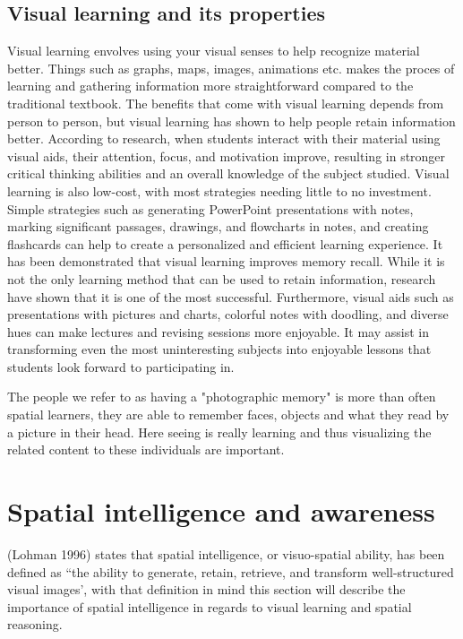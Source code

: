 \subsection{Visual learning and its properties}\label{ch:visualLearningAndItsProperties}
Visual learning envolves using your visual senses to help recognize material better. Things such as graphs, maps, images, animations etc. makes the proces of learning and gathering information more straightforward compared to the traditional textbook. The benefits that come with visual learning depends from person to person, but visual learning has shown to help people retain information better.
According to research, when students interact with their material using visual aids, their attention, focus, and motivation improve, resulting in stronger critical thinking abilities and an overall knowledge of the subject studied. Visual learning is also low-cost, with most strategies needing little to no investment. Simple strategies such as generating PowerPoint presentations with notes, marking significant passages, drawings, and flowcharts in notes, and creating flashcards can help to create a personalized and efficient learning experience.
It has been demonstrated that visual learning improves memory recall. While it is not the only learning method that can be used to retain information, research have shown that it is one of the most successful. Furthermore, visual aids such as presentations with pictures and charts, colorful notes with doodling, and diverse hues can make lectures and revising sessions more enjoyable.
It may assist in transforming even the most uninteresting subjects into enjoyable lessons that students look forward to participating in.\cite{visuallearning}

The people we refer to as having a "photographic memory" is more than often spatial learners, they are able to remember faces, objects and what they read by a picture in their head. Here seeing is really learning and thus visualizing the related content to these individuals are important\cite{herd1997}.

\section{Spatial intelligence and awareness}\label{ch:spatialIntelligenceAndAwareness}
(Lohman 1996) states that spatial intelligence, or visuo-spatial ability, has been defined as ``the ability to generate, retain, retrieve, and transform well-structured visual images'\cite[p97]{tapsfield1996}, with that definition in mind this section will describe the importance of spatial intelligence in regards to visual learning and spatial reasoning.

